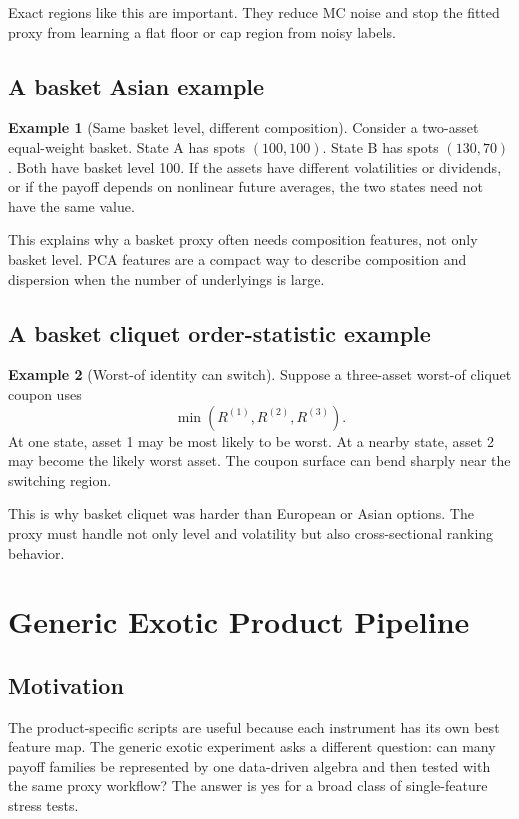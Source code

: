 \documentclass[11pt,oneside]{book}
\theoremstyle{definition}
\newtheorem{example}{Example}[chapter]
\begin{document}
Exact regions like this are important. They reduce MC noise and stop the fitted proxy from learning a flat floor or cap region from noisy labels.

\section{A basket Asian example}
\begin{example}[Same basket level, different composition]
Consider a two-asset equal-weight basket. State A has spots \((100,100)\). State B has spots \((130,70)\). Both have basket level 100. If the assets have different volatilities or dividends, or if the payoff depends on nonlinear future averages, the two states need not have the same value.
\end{example}

This explains why a basket proxy often needs composition features, not only basket level. PCA features are a compact way to describe composition and dispersion when the number of underlyings is large.

\section{A basket cliquet order-statistic example}
\begin{example}[Worst-of identity can switch]
Suppose a three-asset worst-of cliquet coupon uses
\[
  \min(R^{(1)},R^{(2)},R^{(3)}).
\]
At one state, asset 1 may be most likely to be worst. At a nearby state, asset 2 may become the likely worst asset. The coupon surface can bend sharply near the switching region.
\end{example}

This is why basket cliquet was harder than European or Asian options. The proxy must handle not only level and volatility but also cross-sectional ranking behavior.

\chapter{Generic Exotic Product Pipeline}

\section{Motivation}
The product-specific scripts are useful because each instrument has its own
best feature map. The generic exotic experiment asks a different question: can
many payoff families be represented by one data-driven algebra and then tested
with the same proxy workflow? The answer is yes for a broad class of
single-feature stress tests.
\end{document}
